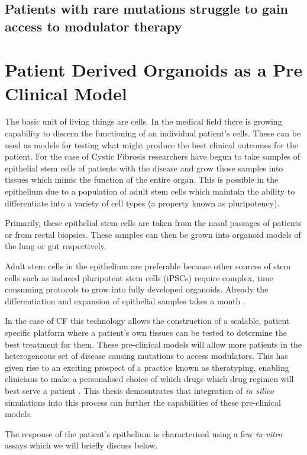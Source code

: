 \subsection{Patients with rare mutations struggle to gain access to modulator therapy}

\section{Patient Derived Organoids as a Pre Clinical Model}
The basic unit of living things are cells. In the medical field there is growing capability to discern the functioning of an individual patient's cells. These can be used as models for testing what might produce the best clinical outcomes for the patient. For the case of Cystic Fibrosis researchers have begun to take samples of epithelial stem cells of patients with the disease and grow those samples into tissues which mimic the function of the entire organ\cite{depoel2020}. This is possible in the epithelium due to a population of adult stem cells which maintain the ability to differentiate into a variety of cell types (a property known as pluripotency). 

Primarily, these epithelial stem cells are taken from the nasal passages of patients or from rectal biopsies. These samples can then be grown into organoid models of the lung or gut respectively. 

Adult stem cells in the epithelium are preferable because other sources of stem cells such as induced pluripotent stem cells (iPSCs) require complex, time consuming protocols to grow into fully developed organoids. Already the differentiation and expansion of epithelial samples takes a month \cite{}.

In the case of CF this technology allows the construction of a scalable, patient specific platform where a patient's own tissues can be tested to determine the best treatment for them. These pre-clinical models will allow more patients in the heterogeneous set of disease causing mutations to access modulators. This has given rise to an exciting prospect of a practice known as theratyping, enabling clinicians to make a personalised choice of which drugs which drug regimen will best serve a patient \cite{clancy2019, wong2022, wong2022a, ciciriello2022}. This thesis demosntrates that integration of \textit{in silico} simulations into this process can further the capabilities of these pre-clinical models.

The response of the patient's epithelium is characterised using a few \textit{in vitro} assays which we will briefly discuss below. 


